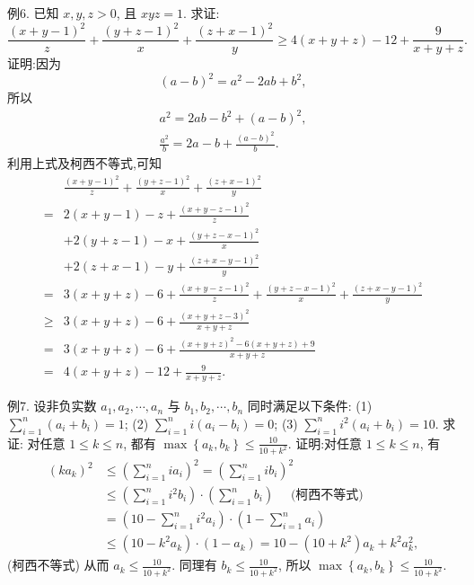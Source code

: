 例6. 已知 $x, y, z>0$, 且 $x y z=1$. 求证:
$$
\frac{(x+y-1)^2}{z}+\frac{(y+z-1)^2}{x}+\frac{(z+x-1)^2}{y} \geqslant 4(x+y+z)-12+\frac{9}{x+y+z} .
$$
证明:因为
$$
(a-b)^2=a^2-2 a b+b^2,
$$
所以
$$
\begin{gathered}
a^2=2 a b-b^2+(a-b)^2, \\
\frac{a^2}{b}=2 a-b+\frac{(a-b)^2}{b} .
\end{gathered}
$$
利用上式及柯西不等式,可知
$$
\begin{aligned}
& \frac{(x+y-1)^2}{z}+\frac{(y+z-1)^2}{x}+\frac{(z+x-1)^2}{y} \\
= & 2(x+y-1)-z+\frac{(x+y-z-1)^2}{z} \\
& +2(y+z-1)-x+\frac{(y+z-x-1)^2}{x} \\
& +2(z+x-1)-y+\frac{(z+x-y-1)^2}{y} \\
= & 3(x+y+z)-6+\frac{(x+y-z-1)^2}{z}+\frac{(y+z-x-1)^2}{x}+\frac{(z+x-y-1)^2}{y} \\
\geqslant & 3(x+y+z)-6+\frac{(x+y+z-3)^2}{x+y+z} \\
= & 3(x+y+z)-6+\frac{(x+y+z)^2-6(x+y+z)+9}{x+y+z} \\
= & 4(x+y+z)-12+\frac{9}{x+y+z} .
\end{aligned}
$$



例7. 设非负实数 $a_1, a_2, \cdots, a_n$ 与 $b_1, b_2, \cdots, b_n$ 同时满足以下条件:
(1) $\sum_{i=1}^n\left(a_i+b_i\right)=1$;
(2) $\sum_{i=1}^n i\left(a_i-b_i\right)=0$;
(3) $\sum_{i=1}^n i^2\left(a_i+b_i\right)=10$.
求证: 对任意 $1 \leqslant k \leqslant n$, 都有 $\max \left\{a_k, b_k\right\} \leqslant \frac{10}{10+k^2}$.
证明:对任意 $1 \leqslant k \leqslant n$, 有
$$
\begin{aligned}
\left(k a_k\right)^2 & \leqslant\left(\sum_{i=1}^n i a_i\right)^2=\left(\sum_{i=1}^n i b_i\right)^2 \\
& \leqslant\left(\sum_{i=1}^n i^2 b_i\right) \cdot\left(\sum_{i=1}^n b_i\right) \quad \text { (柯西不等式) } \\
& =\left(10-\sum_{i=1}^n i^2 a_i\right) \cdot\left(1-\sum_{i=1}^n a_i\right) \\
& \leqslant\left(10-k^2 a_k\right) \cdot\left(1-a_k\right)=10-\left(10+k^2\right) a_k+k^2 a_k^2,
\end{aligned}
$$
(柯西不等式)
从而 $a_k \leqslant \frac{10}{10+k^2}$.
同理有 $b_k \leqslant \frac{10}{10+k^2}$, 所以 $\max \left\{a_k, b_k\right\} \leqslant \frac{10}{10+k^2}$.



